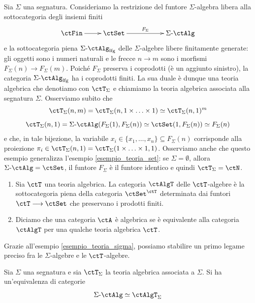 \begin{example}\label{esempio_teoria_sigma}
 Sia \(\Sigma\) una segnatura. Consideriamo la restrizione del funtore \(\Sigma\)-algebra libera alla sottocategoria degli insiemi finiti
 \[\xymatrix{\ctFin \ar[r] & \ctSet \ar[rr]^-{F_{\Sigma}} & & \ctSAlg}\]
 e la sottocategoria piena \(\ctSAlg_{\mathrm{lfg}}\) delle \(\Sigma\)-algebre libere finitamente generate: gli oggetti sono i numeri naturali e le frecce
 \(n \to m\) sono i morfismi \(F_{\Sigma}(n) \to F_{\Sigma}(m)\). Poiché \(F_{\Sigma}\) preserva i coprodotti (è un aggiunto sinistro), la
 categoria \(\ctSAlg_{\mathrm{lfg}}\) ha i coprodotti finiti. La sua duale è dunque una teoria algebrica che denotiamo con \(\ctT_{\Sigma}\) e
 chiamiamo la teoria algebrica associata alla segnatura \(\Sigma\).
 Osserviamo subito che
 \[\ctT_{\Sigma}(n,m) = \ctT_{\Sigma}(n,1 \times \ldots \times 1) \simeq \ctT_{\Sigma}(n,1)^m\]
 \[\ctT_{\Sigma}(n,1) = \ctSAlg(F_{\Sigma}(1),F_{\Sigma}(n)) \simeq \ctSet(1,F_{\Sigma}(n)) \simeq F_{\Sigma}(n)\]
 e che, in tale bijezione, la variabile \(x_i \in \{x_1,\ldots,x_n\} \subseteq F_{\Sigma}(n)\) corrisponde alla proiezione
 \(\pi_i \in \ctT_{\Sigma}(n,1) = \ctT_{\Sigma}(1 \times \ldots \times 1,1)\).
 Osserviamo anche che questo esempio generalizza l'esempio \ref{esempio_teoria_set}: se \(\Sigma = \emptyset\), allora \(\ctSAlg = \ctSet\),
 il funtore \(F_{\Sigma}\) è il funtore identico e quindi \(\ctT_{\Sigma} = \ctN\).
\end{example}

\begin{definition}\label{def_Talg}
 \hfill
 \begin{enumerate}
  \item Sia \(\ctT\) una teoria algebrica. La categoria \(\ctAlgT\) delle \(\ctT\)-algebre è la sottocategoria piena della categoria \(\ctSet^{\ctT}\) determinata dai funtori \(\ctT \fun \ctSet\) che preservano i prodotti finiti.
  \item Diciamo che una categoria \(\ctA\) è algebrica se è equivalente alla categoria \(\ctAlgT\) per una qualche teoria algebrica \(\ctT\).
 \end{enumerate}
\end{definition}

Grazie all'esempio \ref{esempio_teoria_sigma}, possiamo stabilire un primo legame preciso fra le \(\Sigma\)-algebre e le \(\ctT\)-algebre.

\begin{proposition}\label{prop_sigma_T_alg}
 Sia \(\Sigma\) una segnatura e sia \(\ctT_{\Sigma}\) la teoria algebrica associata a \(\Sigma\). Si ha un'equivalenza di categorie
 \[\ctSAlg \simeq \ctAlgT_{\Sigma}\]
\end{proposition}

